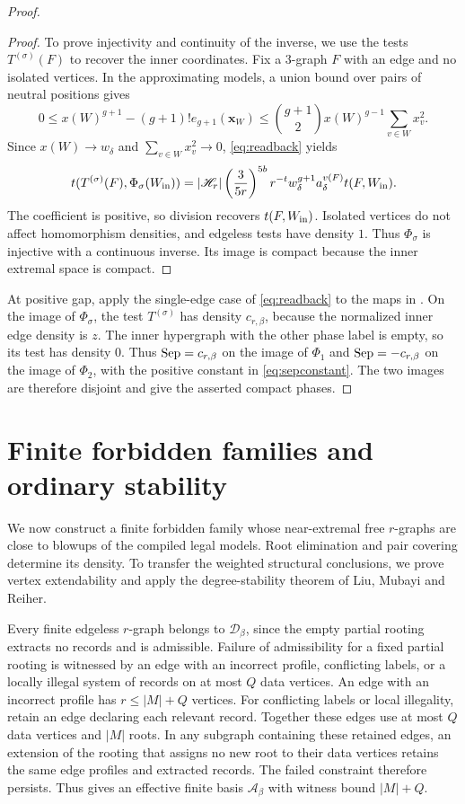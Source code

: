 \documentclass[10pt]{article}
\numberwithin{equation}{section}
\theoremstyle{definition}
\newcommand{\cA}{\mathcal A}\newcommand{\cB}{\mathcal B}\newcommand{\cC}{\mathcal C}
\newcommand{\cD}{\mathcal D}\newcommand{\cE}{\mathcal E}\newcommand{\cF}{\mathcal F}
\newcommand{\x}{\boldsymbol{x}}\newcommand{\y}{\boldsymbol{y}}
\begin{document}
\begin{proof}
\begin{proof}
To prove injectivity and continuity of the inverse, we use the tests $T^{(\sigma)}(F)$ to recover the inner coordinates. Fix a $3$-graph $F$ with an edge and no isolated vertices. In the approximating models, a union bound over pairs of neutral positions gives
\[
 0\le x(W)^{g+1}-(g+1)!e_{g+1}(\x_W)
 \le\binom{g+1}{2}x(W)^{g-1}\sum_{v\in W}x_v^2.
\]
Since $x(W)\to w_\delta$ and $\sum_{v\in W}x_v^2\to0$, \eqref{eq:readback} yields
\[
 t(T^{(\sigma)}(F),\Phi_\sigma(W_{\rm in}))
 =|\mathscr H_r|\left(\frac{3}{5r}\right)^{5b}r^{-t}
       w_\delta^{g+1}a_\delta^{v(F)}t(F,W_{\rm in}).
\]
The coefficient is positive, so division recovers $t(F,W_{\rm in})$. Isolated vertices do not affect homomorphism densities, and edgeless tests have density $1$. Thus $\Phi_\sigma$ is injective with a continuous inverse. Its image is compact because the inner extremal space is compact.
\end{proof}

At positive gap, apply the single-edge case of \eqref{eq:readback} to the maps in . On the image of $\Phi_\sigma$, the test $T^{(\sigma)}$ has density $c_{r,\beta}$, because the normalized inner edge density is $z$. The inner hypergraph with the other phase label is empty, so its test has density $0$. Thus $\operatorname{Sep}=c_{r,\beta}$ on the image of $\Phi_1$ and $\operatorname{Sep}=-c_{r,\beta}$ on the image of $\Phi_2$, with the positive constant in \eqref{eq:sepconstant}. The two images are therefore disjoint and give the asserted compact phases.
\end{proof}

\section{Finite forbidden families and ordinary stability}\label{sec:transfer}
We now construct a finite forbidden family whose near-extremal free $r$-graphs are close to blowups of the compiled legal models. Root elimination and pair covering determine its density. To transfer the weighted structural conclusions, we prove vertex extendability and apply the degree-stability theorem of Liu, Mubayi and Reiher.

Every finite edgeless $r$-graph belongs to $\cD_\beta$, since the empty partial rooting extracts no records and is admissible. Failure of admissibility for a fixed partial rooting is witnessed by an edge with an incorrect profile, conflicting labels, or a locally illegal system of records on at most $Q$ data vertices. An edge with an incorrect profile has $r\le |M|+Q$ vertices. For conflicting labels or local illegality, retain an edge declaring each relevant record. Together these edges use at most $Q$ data vertices and $|M|$ roots. In any subgraph containing these retained edges, an extension of the rooting that assigns no new root to their data vertices retains the same edge profiles and extracted records. The failed constraint therefore persists. Thus  gives an effective finite basis $\cA_\beta$ with witness bound $|M|+Q$.
\end{document}
